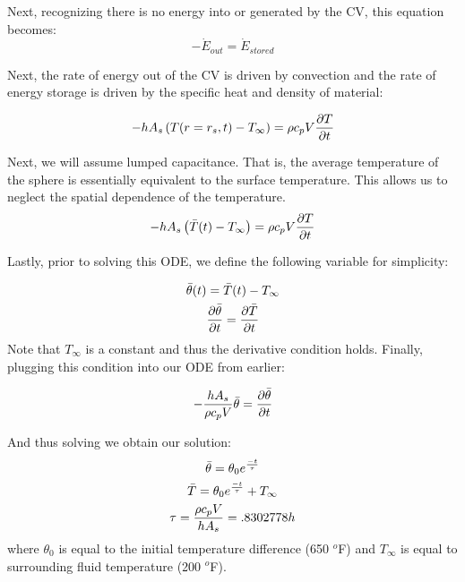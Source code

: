 \documentclass{article}
\begin{document}
Next, recognizing there is no energy into or generated by the CV, this equation becomes:
\begin{equation}
    -\Dot{E}_{out} = \Dot{E}_{stored}
\end{equation}

Next, the rate of energy out of the CV is driven by convection and the rate of energy storage is driven by the specific heat and density of material:

\begin{equation}
    -h A_s \left(T(r=r_s,t) - T_{\infty}\right) = \rho c_p V \frac{\partial T}{\partial t}
\end{equation}

Next, we will assume lumped capacitance. That is, the average temperature of the sphere is essentially equivalent to the surface temperature. This allows us to neglect the spatial dependence of the temperature. 
\begin{equation}
    -h A_s \left(\Bar{T}(t) - T_{\infty}\right) = \rho c_p V \frac{\partial T}{\partial t}
\end{equation}

Lastly, prior to solving this ODE, we define the following variable for simplicity:

\begin{equation}
    \begin{gathered}
    \Bar{\theta}(t) = \Bar{T}(t) - T_{\infty}\\
    \frac{\partial \Bar{\theta}}{\partial t} = \frac{\partial \Bar{T}}{\partial t}
    \end{gathered}
\end{equation}
Note that $T_{\infty}$ is a constant and thus the derivative condition holds. Finally, plugging this condition into our ODE from earlier:

\begin{equation}
    -\frac{h A_s }{\rho c_p V} \Bar{\theta} = \frac{\partial \Bar{\theta}}{\partial t}
\end{equation}

And thus solving we obtain our solution:
\begin{equation}
    \begin{gathered}
        \Bar{\theta} = \theta_0 e^{\frac{-t}{\tau}} \\
        \Bar{T} = \theta_0 e^{\frac{-t}{\tau}} + T_{\infty} \\
        \tau = \frac{\rho c_p V}{h A_s} = .8302778 h
    \end{gathered}
\end{equation}
where $\theta_0$ is equal to the initial temperature difference (650 $^o$F) and $T_{\infty}$ is equal to surrounding fluid temperature (200 $^o$F). 
\end{document}
